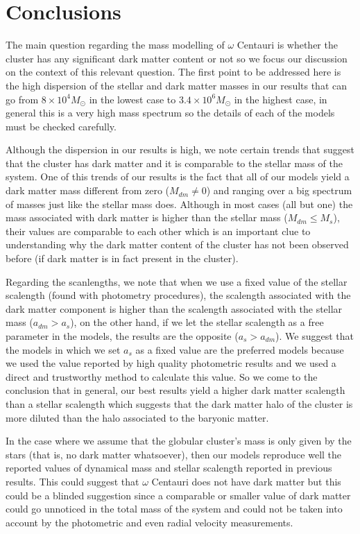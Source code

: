 \chapter{Conclusions}

The main question regarding the mass modelling of $\omega$ Centauri is whether the cluster has any significant dark matter content or not so we focus our discussion on the context of this relevant question. The first point to be addressed here is the high dispersion of the stellar and dark matter masses in our results that can go from $8 \times 10^{4} M_{\odot}$ in the lowest case to $3.4 \times 10^{6} M_{\odot}$ in the highest case, in general this is a very high mass spectrum so the details of each of the models must be checked carefully.

Although the dispersion in our results is high, we note certain trends that suggest that the cluster has dark matter and it is comparable to the stellar mass of the system. One of this trends of our results is the fact that all of our models yield a dark matter mass different from zero ($M_{dm}\neq 0$) and ranging over a big spectrum of masses just like the stellar mass does. Although in most cases (all but one) the mass associated with dark matter is higher than the stellar mass ($M_{dm}\leq M_{s}$), their values are comparable to each other which is an important clue to understanding why the dark matter content of the cluster has not been observed before (if dark matter is in fact present in the cluster).

Regarding the scanlengths, we note that when we use a fixed value of the stellar scalength (found with photometry procedures), the scalength associated with the dark matter component is higher than the scalength associated with the stellar mass ($a_{dm} > a_{s}$), on the other hand, if we let the stellar scalength as a free parameter in the models, the results are the opposite ($a_{s} > a_{dm}$). We suggest that the models in which we set $a_{s}$ as a fixed value are the preferred models because we used the value reported by high quality photometric results and we used a direct and trustworthy method to calculate this value. So we come to the conclusion that in general, our best results yield a higher dark matter scalength than a stellar scalength which suggests that the dark matter halo of the cluster is more diluted than the halo associated to the baryonic matter.

In the case where we assume that the globular cluster's mass is only given by the stars (that is, no dark matter whatsoever), then our models reproduce well the reported values of dynamical mass and stellar scalength reported in previous results. This could suggest that $\omega$ Centauri does not have dark matter but this could be a blinded suggestion since a comparable or smaller value of dark matter could go unnoticed in the total mass of the system and could not be taken into account by the photometric and even radial velocity measurements.   


